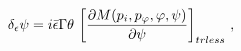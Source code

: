 \begin{equation}\label{7}
\delta_\epsilon \psi=i\bar\epsilon\Gamma\theta\, \left[{{\partial
M(p_i,p_{\varphi},\varphi,\psi)}\over{\partial
\psi}}\right]_{trless}\,,
\end{equation}

